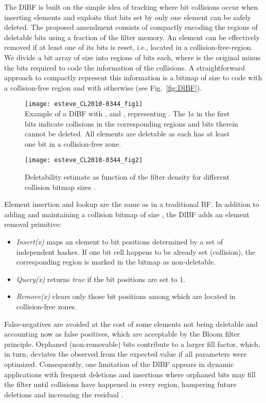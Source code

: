 \documentclass[conference]{IEEEtran}
\begin{document}
The DlBF is built on the simple idea of tracking where bit collisions occur when inserting elements and exploits that bits set by only one element can be safely deleted. The proposed amendment consists of compactly encoding the regions of deletable bits using a fraction of the filter memory. 
An element can be effectively removed if at least one of its bits is reset, i.e., located in a collision-free-region.
 We divide a bit array of size   into  regions of  bits each, where  is the original  minus the bits required to code the information of the collisions. A straightforward approach to compactly represent this information is a bitmap of size  to code with  a collision-free region and with  otherwise (see Fig.~\ref{fig:DlBF}). \begin{figure*}[t] \begin{minipage}[b]{0.6\linewidth}
           \texttt{[image: esteve\_CL2010-0344\_fig1]}\\
           \caption{Example of a DlBF with ,  and , representing . The 1s in the first  bits indicate collisions in the corresponding regions and bits therein cannot be deleted. All elements are deletable as each has at least one bit in a collision-free zone.}
           \label{fig:DlBF}
       \end{minipage}\hfill
       \begin{minipage}[b]{0.38\linewidth}
           \texttt{[image: esteve\_CL2010-0344\_fig2]}\\
           \caption{Deletability estimate as function of the filter density  for different collision bitmap sizes .}
           \label{fig:del-r}
       \end{minipage}\hfill
   \end{figure*}
Element insertion and lookup are the same as in a traditional BF. In addition to adding and maintaining a collision bitmap of size , the DlBF adds an element removal primitive:
\begin{itemize}
\item \textit{Insert(x)} maps an element  to  bit positions determined by a set of independent hashes. If one bit cell happens to be already set (collision), the corresponding region is marked in the  bitmap as non-deletable.
\item  \textit{Query(x)}  returns \textit{true} if the  bit positions are set to 1. \item  \textit{Remove(x)} clears only those bit positions among  which are located in collision-free zones. 
\end{itemize}
False-negatives are avoided at the cost of some elements not being deletable and accounting now as false positives, which are acceptable by the Bloom filter principle. Orphaned (non-removable) bits contribute to a larger fill factor, which, in turn, deviates the observed  from the expected value if all parameters were optimized. 
Consequently, one limitation of the DlBF appears in dynamic applications with frequent deletions and insertions where orphaned bits may fill the filter until collisions have happened in every region, hampering future deletions and increasing the residual . 
\end{document}
